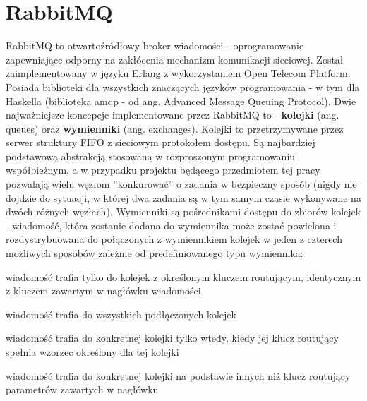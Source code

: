 \chapter{RabbitMQ}
\label{cha:rabbitmq}
RabbitMQ to otwartoźródłowy broker wiadomości - oprogramowanie zapewniające odporny na zakłócenia mechanizm komunikacji sieciowej. Został zaimplementowany w języku Erlang z wykorzystaniem Open Telecom Platform. Posiada biblioteki dla wszystkich znaczących języków programowania - w tym dla Haskella (biblioteka amqp - od ang. Advanced Message Queuing Protocol). Dwie najważniejsze koncepcje implementowane przez RabbitMQ to - \textbf{kolejki} (ang. queues) oraz \textbf{wymienniki} (ang. exchanges). Kolejki to przetrzymywane przez serwer struktury FIFO z sieciowym protokołem dostępu. Są najbardziej podstawową abstrakcją stosowaną w rozproszonym programowaniu współbieżnym, a w przypadku projektu będącego przedmiotem tej pracy pozwalają wielu węzłom ''konkurować'' o zadania w bezpieczny sposób (nigdy nie dojdzie do sytuacji, w której dwa zadania są w tym samym czasie wykonywane na dwóch różnych węzłach). Wymienniki są pośrednikami dostępu do zbiorów kolejek - wiadomość, która zostanie dodana do wymiennika może zostać powielona i rozdystrybuowana do połączonych z wymiennikiem kolejek w jeden z czterech możliwych sposobów zależnie od predefiniowanego typu wymiennika:
\begin{description}[align=left]
  \item [direct] wiadomość trafia tylko do kolejek z określonym kluczem routującym, identycznym z kluczem zawartym w nagłówku wiadomości
  \item [fanout] wiadomość trafia do wszystkich podłączonych kolejek
  \item [topic] wiadomość trafia do konkretnej kolejki tylko wtedy, kiedy jej klucz routujący spełnia wzorzec określony dla tej kolejki 
  \item [headers] wiadomość trafia do konkretnej kolejki na podstawie innych niż klucz routujący parametrów zawartych w nagłówku
  \end{description}